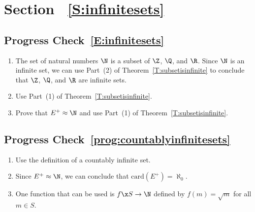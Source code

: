 \section*{Section ~\ref{S:infinitesets}}

\subsection*{Progress Check~\ref{E:infinitesets}}
\begin{enumerate}
\item The set of natural numbers $\N$ is a subset of $\Z$, $\Q$, and $\R$.  Since $\N$ is an infinite set, we can use Part~(2) of Theorem~\ref{T:subsetisinfinite} to conclude that $\Z$, 
$\Q$, and $\R$ are infinite sets.

\item Use Part~(1) of Theorem~\ref{T:subsetisinfinite}.

\item Prove that $E^+ \approx \N$ and use Part~(1) of Theorem~\ref{T:subsetisinfinite}.
\end{enumerate}



\subsection*{Progress Check~\ref{prog:countablyinfinitesets}}
\begin{enumerate}
\item Use the definition of a countably infinite set.

\item Since $E^+ \approx \N$, we can conclude that $\text{card} ( E^+ ) = \aleph_0$.

\item One function that can be used is $f\x S \to \N$ defined by $f(m) = \sqrt{m}$ for all 
$m \in S$.
\end{enumerate}


\hbreak

\endinput

